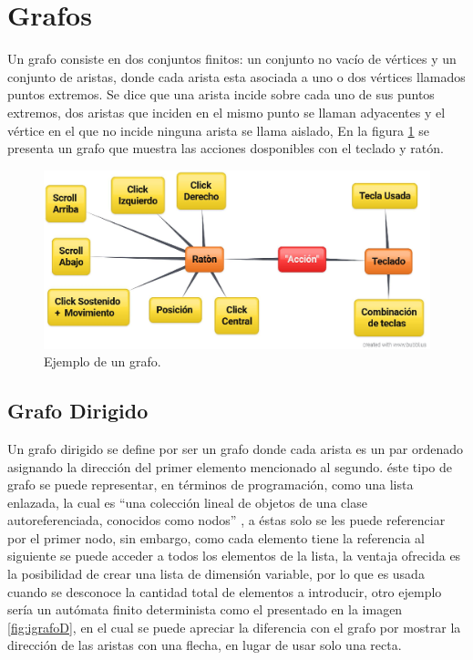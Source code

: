 
\section{Grafos}
Un grafo consiste en dos conjuntos finitos: un conjunto no vac\'io de
 v\'ertices y un conjunto de aristas, donde cada arista esta asociada 
 a uno o dos v\'ertices llamados puntos extremos\cite{SUSANNAS.EPP2012}. 
 Se dice que una arista incide sobre cada uno de sus puntos extremos, 
 dos aristas que inciden en el mismo punto se llaman adyacentes y el 
 v\'ertice en el que no incide ninguna arista se llama 
 aislado\cite{SUSANNAS.EPP2012}, En la figura \ref{fig:igrafo} se
 presenta un grafo que muestra las acciones dosponibles con el 
 teclado y rat\'on.
 
\begin{figure}[h]
\centering
\includegraphics[width=0.8\columnwidth]{chap3/Imagenes/Grafo.eps}
\caption{Ejemplo de un grafo.}
\label{fig:igrafo}
\end{figure}


\subsection{Grafo Dirigido}
Un grafo dirigido se define por ser un grafo donde cada arista es un 
 par ordenado asignando la direcci\'on del primer elemento mencionado 
 al segundo\cite{SUSANNAS.EPP2012}. \'este tipo de grafo se puede 
 representar, en t\'erminos de programaci\'on,  como una lista enlazada, 
 la cual es ``una colecci\'on lineal de objetos de una clase autoreferenciada, 
 conocidos como nodos'' \cite{deitel2008java}, a \'estas solo se les puede 
 referenciar por el primer nodo, sin embargo, como cada elemento tiene la 
 referencia al siguiente se puede acceder a todos los elementos de la lista, 
 la ventaja ofrecida es la posibilidad de crear una lista de dimensi\'on 
 variable, por lo que es usada cuando se desconoce la cantidad total de 
 elementos a introducir\cite{deitel2008java}, otro ejemplo ser\'ia un 
 aut\'omata finito determinista como el presentado en la imagen
 \ref{fig:igrafoD}, en el cual se puede apreciar la diferencia con el grafo 
 por mostrar la direcci\'on de las aristas con una flecha, en lugar de usar 
 solo una recta.
 
